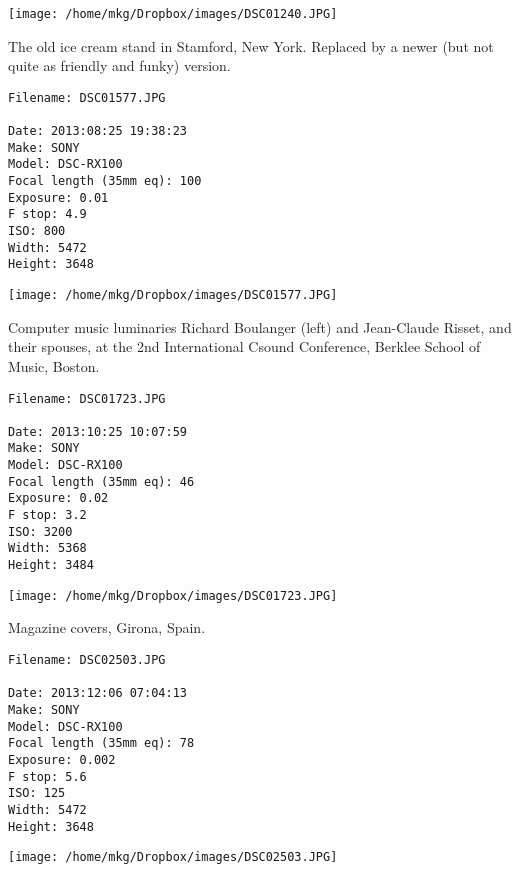 \begin{landscape}

\texttt{[image: /home/mkg/Dropbox/images/DSC01240.JPG]}
\end{landscape}



\noindent The old ice cream stand in Stamford, New York. Replaced by a newer (but not quite as friendly and funky) version.
\begin{lstlisting}
Filename: DSC01577.JPG

Date: 2013:08:25 19:38:23
Make: SONY
Model: DSC-RX100
Focal length (35mm eq): 100
Exposure: 0.01
F stop: 4.9
ISO: 800
Width: 5472
Height: 3648
\end{lstlisting}

\begin{landscape}

\texttt{[image: /home/mkg/Dropbox/images/DSC01577.JPG]}
\end{landscape}



\noindent Computer music luminaries Richard Boulanger (left) and Jean-Claude Risset, and their spouses, at the 2nd International Csound Conference, Berklee School of Music, Boston.
\begin{lstlisting}
Filename: DSC01723.JPG

Date: 2013:10:25 10:07:59
Make: SONY
Model: DSC-RX100
Focal length (35mm eq): 46
Exposure: 0.02
F stop: 3.2
ISO: 3200
Width: 5368
Height: 3484
\end{lstlisting}

\begin{landscape}

\texttt{[image: /home/mkg/Dropbox/images/DSC01723.JPG]}
\end{landscape}



\noindent Magazine covers, Girona, Spain.
\begin{lstlisting}
Filename: DSC02503.JPG

Date: 2013:12:06 07:04:13
Make: SONY
Model: DSC-RX100
Focal length (35mm eq): 78
Exposure: 0.002
F stop: 5.6
ISO: 125
Width: 5472
Height: 3648
\end{lstlisting}

\begin{landscape}

\texttt{[image: /home/mkg/Dropbox/images/DSC02503.JPG]}
\end{landscape}



